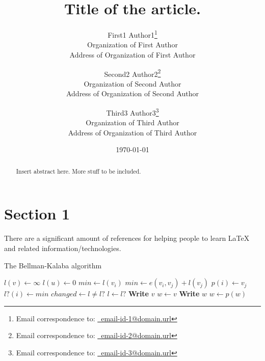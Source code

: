 \documentclass[letter,12pt]{article}
\begin{document}
\title{Title of the article.}
\date{\today}
\author{
	First1 Author1\thanks{Email correspondence to: \href{mailto:email-id-1@domain.url}{\Email\ email-id-1@domain.url}} \\
		Organization of First Author\\
		Address of Organization of First Author
	\and
	Second2 Author2\thanks{Email correspondence to: \href{mailto:email-id-2@domain.url}{\Email\ email-id-2@domain.url}} \\
		Organization of Second Author\\
		Address of Organization of Second Author
	\and
	Third3 Author3\thanks{Email correspondence to: \href{mailto:email-id-3@domain.url}{\Email\ email-id-3@domain.url}} \\
		Organization of Third Author\\
		Address of Organization of Third Author
}
\maketitle


\begin{abstract} 
Insert abstract here. More stuff to be included.
\end{abstract}





\section{Section 1}
\label{sec:mysection1}

There are a significant amount of references for helping people to learn \LaTeX \cite{Voss2011,vanDongen2012,Syropoulos2003,Raymond2004,Mittelbach2004,Lamport1994,Krishnan2003,Krantz2001,Kottwitz2011,Koranne2011,Kopka2004,Knuth1999,Hoenig1998,Higham1998,Haralambous2007,Griffiths1997,Gratzer2007,Goossens2007,Goossens1999,Goossens1997,Diller1999,Bindner2011,Berry2009,UITCambridge2011,Scharrer2011,Pakin2008,Cormen2010,Syropoulos2004,Hamalainen2006} and related information/technologies.



\begin{algorithm}
\caption{The Bellman-Kalaba algorithm}
\begin{algorithmic}[1]
		\State $l(v) \leftarrow \infty$
	\EndFor
	\State $l(u) \leftarrow 0$
	\Repeat
		\State $min \leftarrow l(v_i)$
					\State $min \leftarrow e(v_i, v_j) + l(v_j)$
					\State $p(i) \leftarrow v_j$
				\EndIf
			\EndFor
			\State $l?(i) \leftarrow min$
		\EndFor
		\State $changed \leftarrow l \not= l?$
		\State $l \leftarrow l?$
\EndProcedure
\Statex
{}
		\State \textbf{Write} $v$
	\Else
		\State $w \leftarrow v$
			\State \textbf{Write} $w$
			\State $w \leftarrow p(w)$
		\EndWhile
	\EndIf
\EndProcedure
\end{algorithmic}
\end{algorithm}
\end{document}
